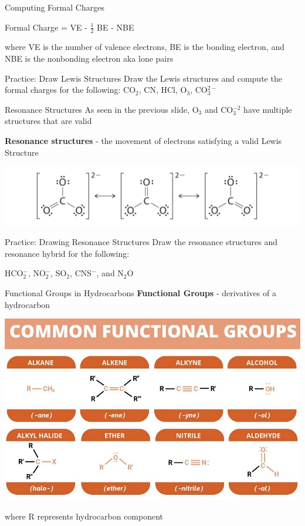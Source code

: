 \documentclass[11pt]{beamer}
\begin{document}
\begin{frame}{Computing Formal Charges}
  \begin{center}
    Formal Charge = VE - $\frac{1}{2}$ BE - NBE
  \end{center}
  where VE is the number of valence electrons, BE is the bonding
  electron, and NBE is the nonbonding electron aka lone pairs
\end{frame}

\begin{frame}{Practice: Draw Lewis Structures}
  Draw the Lewis structures and compute the formal charges for the
  following: CO$_2$, CN, HCl, O$_3$, CO$_3^{2-}$
  \vspace{1.75in}
\end{frame}

\begin{frame}{Resonance Structures}
  As seen in the previous slide, O$_3$ and CO$_3^{-2}$ have multiple
  structures that are valid

  \textbf{Resonance structures} - the movement of electrons satisfying
  a valid Lewis Structure
  
  \centering
  \includegraphics[width=1\linewidth]{resonance_struct}
\end{frame}

\begin{frame}{Practice: Drawing Resonance Structures}
  Draw the resonance structures and resonance hybrid for the following:

  HCO$_2^{-}$, NO$_2^-$, SO$_2$, CNS$^-$, and N$_2$O
  \vspace{1.75in}
\end{frame}

\begin{frame}{Functional Groups in Hydrocarbons}
  \textbf{Functional Groups} - derivatives of a hydrocarbon
  \begin{center}
    \includegraphics[width=0.8\linewidth]{func_groups}
  \end{center}
  where R represents hydrocarbon component
\end{frame}
\end{document}
